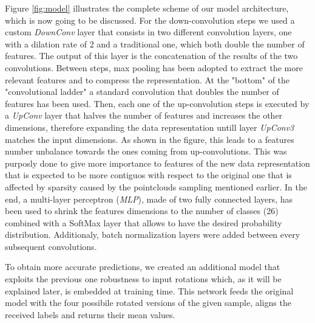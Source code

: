 Figure \ref{fig:model} illustrates the complete scheme of our model architecture, which is now going to be discussed.
For the down-convolution steps we used a custom \textit{DownConv} layer that consists in two different
convolution layers, one with a dilation rate of 2 and a traditional one, which both double the number of features. 
The output of this layer is the concatenation of the results of the two convolutions.
Between steps, max pooling has been adopted to extract the more relevant features and to compress the representation.
At the "bottom" of the "convolutional ladder" a standard convolution that doubles the number of features has been used.
Then, each one of the up-convolution steps is executed by a \textit{UpConv} layer that halves the number of features
and increases the other dimensions, therefore expanding the data representation untill layer \textit{UpConv3} matches the input dimensions.
As shown in the figure, this leads to a features number unbalance towards the ones coming from up-convolutions.
This was purposly done to give more importance to features of the new data representation that is expected to be more 
contiguos with respect to the original one that is affected by sparsity caused by the pointclouds sampling mentioned earlier.
In the end, a multi-layer perceptron (\textit{MLP}), made of two fully connected layers, has been used
to shrink the features dimensions to the number of classes (26) combined with a SoftMax layer that allows
to have the desired probability distribution.
Additionaly, batch normalization layers were added between every subsequent convolutions.

To obtain more accurate predictions, we created an additional model that exploits the previous
one robustness to input rotations which, as it will be explained later, is embedded at training time.
This network feeds the original model with the four possibile rotated versions of the given sample, 
aligns the received labels and returns their mean values.